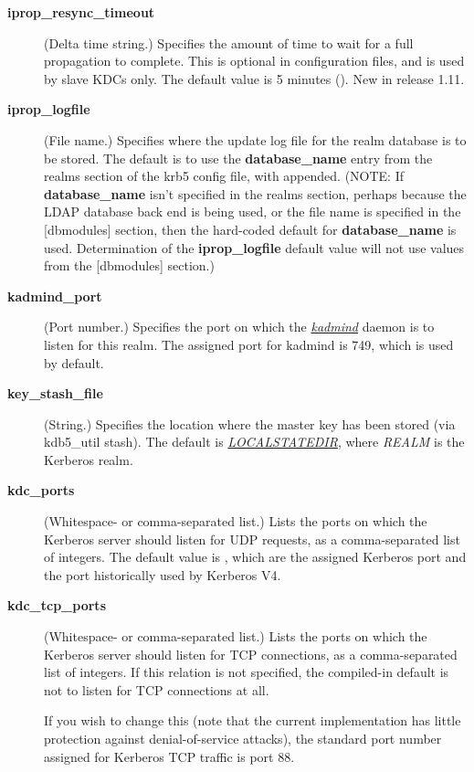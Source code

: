 \documentclass[letterpaper,10pt,english]{sphinxmanual}
\begin{document}
\begin{description}
\item[{\textbf{iprop\_resync\_timeout}}] \leavevmode
(Delta time string.)  Specifies the amount of time to wait for a
full propagation to complete.  This is optional in configuration
files, and is used by slave KDCs only.  The default value is 5
minutes ().  New in release 1.11.

\item[{\textbf{iprop\_logfile}}] \leavevmode
(File name.)  Specifies where the update log file for the realm
database is to be stored.  The default is to use the
\textbf{database\_name} entry from the realms section of the krb5 config
file, with  appended.  (NOTE: If \textbf{database\_name} isn't
specified in the realms section, perhaps because the LDAP database
back end is being used, or the file name is specified in the
{[}dbmodules{]} section, then the hard-coded default for
\textbf{database\_name} is used.  Determination of the \textbf{iprop\_logfile}
default value will not use values from the {[}dbmodules{]} section.)

\item[{\textbf{kadmind\_port}}] \leavevmode
(Port number.)  Specifies the port on which the {\hyperref[admin/admin_commands/kadmind:kadmind-8]{\emph{kadmind}}}
daemon is to listen for this realm.  The assigned port for kadmind
is 749, which is used by default.

\item[{\textbf{key\_stash\_file}}] \leavevmode
(String.)  Specifies the location where the master key has been
stored (via kdb5\_util stash).  The default is {\hyperref[mitK5defaults:paths]{\emph{LOCALSTATEDIR}}}, where \emph{REALM} is the Kerberos realm.

\item[{\textbf{kdc\_ports}}] \leavevmode
(Whitespace- or comma-separated list.)  Lists the ports on which
the Kerberos server should listen for UDP requests, as a
comma-separated list of integers.  The default value is
, which are the assigned Kerberos port and the port
historically used by Kerberos V4.

\item[{\textbf{kdc\_tcp\_ports}}] \leavevmode
(Whitespace- or comma-separated list.)  Lists the ports on which
the Kerberos server should listen for TCP connections, as a
comma-separated list of integers.  If this relation is not
specified, the compiled-in default is not to listen for TCP
connections at all.

If you wish to change this (note that the current implementation
has little protection against denial-of-service attacks), the
standard port number assigned for Kerberos TCP traffic is port 88.


\end{description}
\end{document}
